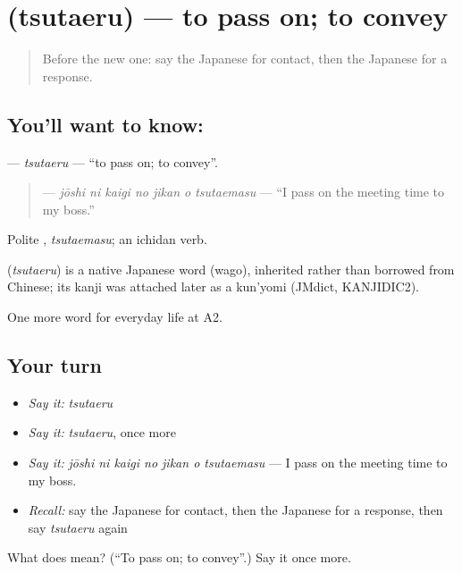 \section[\texorpdfstring{\ja{つたえる} (tsutaeru)}{つたえる (tsutaeru)}]{ (tsutaeru) — to pass on; to convey}

\label{lesson:JA-C231-tsutaeru}



\begin{quote}
Before the new one: say the Japanese for contact, then the Japanese for a response.
\end{quote}

\subsection*{You'll want to know: }
\textbf{} — \emph{tsutaeru} — \textquotedblleft{}to pass on; to convey\textquotedblright{}.

\begin{quote}
\textbf{   } — \emph{jōshi ni kaigi no jikan o tsutaemasu} — \textquotedblleft{}I pass on the meeting time to my boss.\textquotedblright{}
\end{quote}

Polite \textbf{}, \emph{tsutaemasu}; an ichidan verb.

\begin{cousinweb}
\textbf{} (\emph{tsutaeru}) is a native Japanese word (wago), inherited rather than borrowed from Chinese; its kanji was attached later as a kun'yomi (JMdict, KANJIDIC2).
\end{cousinweb}

\begin{grammarlens}[title={What you've built}]
One more word for everyday life at A2.
\end{grammarlens}

\subsection*{Your turn}
\begin{itemize}
\raggedright
  \item \emph{Say it:} \emph{tsutaeru}
  \item \emph{Say it:} \emph{tsutaeru}, once more
  \item \emph{Say it:} \emph{jōshi ni kaigi no jikan o tsutaemasu} — I pass on the meeting time to my boss.
  \item \emph{Recall:} say the Japanese for contact, then the Japanese for a response, then say \emph{tsutaeru} again
\end{itemize}

\begin{tcolorbox}[breakable,colback=teal!4,colframe=teal!35!black,title={Before you move on}]
What does  mean? (\textquotedblleft{}To pass on; to convey\textquotedblright{}.) Say it once more.
\end{tcolorbox}

